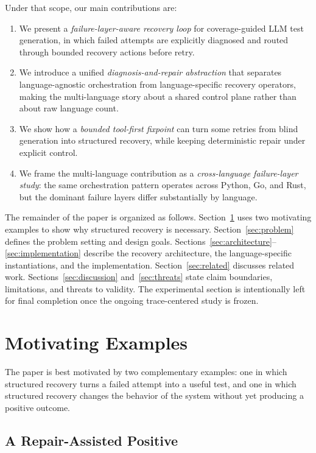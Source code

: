 \documentclass[10pt]{article}
\begin{document}
Under that scope, our main contributions are:

\begin{enumerate}[leftmargin=1.4em]
    \item We present a \emph{failure-layer-aware recovery loop} for coverage-guided LLM test generation, in which failed attempts are explicitly diagnosed and routed through bounded recovery actions before retry.
    \item We introduce a unified \emph{diagnosis-and-repair abstraction} that separates language-agnostic orchestration from language-specific recovery operators, making the multi-language story about a shared control plane rather than about raw language count.
    \item We show how a \emph{bounded tool-first fixpoint} can turn some retries from blind generation into structured recovery, while keeping deterministic repair under explicit control.
    \item We frame the multi-language contribution as a \emph{cross-language failure-layer study}: the same orchestration pattern operates across Python, Go, and Rust, but the dominant failure layers differ substantially by language.
\end{enumerate}

The remainder of the paper is organized as follows. Section~\ref{sec:motivation} uses two motivating examples to show why structured recovery is necessary. Section~\ref{sec:problem} defines the problem setting and design goals. Sections~\ref{sec:architecture}--\ref{sec:implementation} describe the recovery architecture, the language-specific instantiations, and the implementation. Section~\ref{sec:related} discusses related work. Sections~\ref{sec:discussion} and~\ref{sec:threats} state claim boundaries, limitations, and threats to validity. The experimental section is intentionally left for final completion once the ongoing trace-centered study is frozen.

\section{Motivating Examples}
\label{sec:motivation}

The paper is best motivated by two complementary examples: one in which structured recovery turns a failed attempt into a useful test, and one in which structured recovery changes the behavior of the system without yet producing a positive outcome.

\subsection{A Repair-Assisted Positive}
\end{document}

